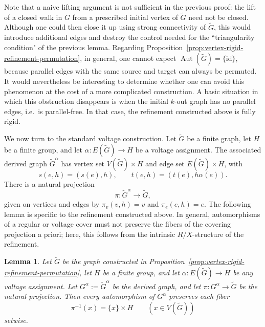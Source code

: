 \documentclass[a4paper,10pt]{amsart}
\theoremstyle{plain}
\newtheorem{lemma}[theorem]{Lemma}
\theoremstyle{definition}
\DeclareMathOperator{\Aut}{Aut}
\newcommand{\id}{\mathrm{id}}
\begin{document}
Note that a naive lifting argument is not sufficient in the previous proof: the lift of a closed walk in $G$ from a prescribed initial vertex of $\widetilde G$ need not be closed. Although one could then close it up using strong connectivity of $\widetilde G$, this would introduce additional edges and destroy the control needed for the ``triangularity condition" of the previous lemma. 
Regarding Proposition~\ref{prop:vertex-rigid-refinement-permutation}, in general, one cannot expect $\Aut(\widetilde G)=\{\id\}$, because parallel edges with the same source and target can always be permuted. It would nevertheless be interesting to determine whether one can avoid this phenomenon at the cost of a more complicated construction. A basic situation in which this obstruction disappears is when the initial $k$-out graph has no parallel edges, i.e.\ is parallel-free. In that case, the refinement constructed above is fully rigid.

We now turn to the standard voltage construction. Let $\widetilde G$ be a finite graph, let $H$ be a finite group, and let $\alpha:E(\widetilde G)\to H$ be a voltage assignment. The associated derived graph $\widetilde G^\alpha$ has vertex set $V(\widetilde G)\times H$ and edge set $E(\widetilde G)\times H$, with
\[
s(e,h)=(s(e),h),\qquad t(e,h)=(t(e),h\alpha(e)).
\]
There is a natural projection
\[
\pi:\widetilde G^\alpha\to \widetilde G,
\]
given on vertices and edges by $\pi_v(v,h)=v$ and $\pi_e(e,h)=e$.
The following lemma is specific to the refinement constructed above. In general, automorphisms of a regular or voltage cover must not preserve the fibers of the covering projection a priori; here, this follows from the intrinsic $R/X$-structure of the refinement.


\begin{lemma}\label{lem:fibers-preserved-derived}
Let $\widetilde G$ be the graph constructed in Proposition~\ref{prop:vertex-rigid-refinement-permutation}, let $H$ be a finite group, and let $\alpha:E(\widetilde G)\to H$ be any voltage assignment. Let $G^\alpha:=\widetilde G^\alpha$ be the derived graph, and let $\pi:G^\alpha\to \widetilde G$ be the natural projection. Then every automorphism of $G^\alpha$ preserves each fiber
\[
\pi^{-1}(x)=\{x\}\times H
\qquad (x\in V(\widetilde G))
\]
setwise.
\end{lemma}
\end{document}
